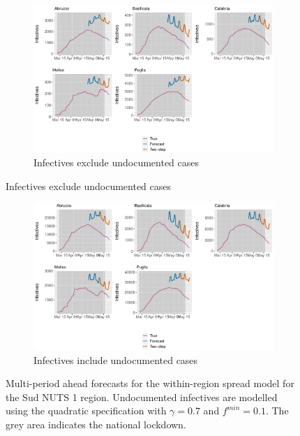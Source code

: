\documentclass[12pt]{article}
\begin{document}
\begin{appendices}
        \begin{figure}[H]
    	    \centering
    	    \begin{subfigure}{\textwidth}
    	      \centering
    	      \includegraphics[width=0.91\linewidth]{output/model_within_lag14_forecast_full_Sud.pdf}
    	      \caption{Infectives exclude undocumented cases}
    	      \label{fig:forecast_full_within_sud_regular}
    	    \end{subfigure}
        \end{figure}
        \begin{figure}[H]\ContinuedFloat
    	    \begin{subfigure}{\textwidth}
    	      \centering
    	      \includegraphics[width=0.91\linewidth]{output/model_within_lag14_forecast_full_Sud_UndocQuadratic.pdf}
    	      \caption{Infectives include undocumented cases}
    	      \label{fig:forecast_full_within_sud_undoc}
    	    \end{subfigure}
    	    \caption{Multi-period ahead forecasts for the within-region spread model for the Sud NUTS 1 region. Undocumented infectives are modelled using the quadratic specification with $\gamma = 0.7$ and $f^{min}=0.1$. The grey area indicates the national lockdown.}
    	    \label{fig:forecast_full_within_sud}
        \end{figure}
        

\end{appendices}
\end{document}
